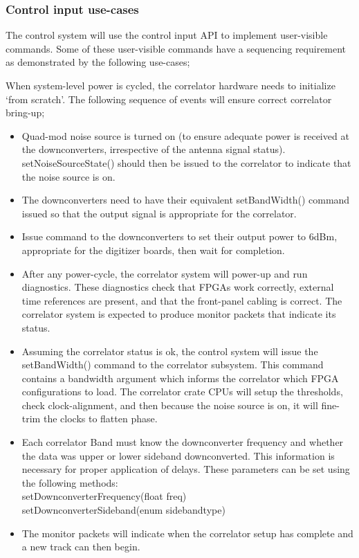 \documentclass[11pt]{article}
\begin{document}
\subsubsection{Control input use-cases}

The control system will use the control input API to implement user-visible
commands. Some of these user-visible commands have a sequencing requirement as
demonstrated by the following use-cases;

\vskip5mm

When system-level power is cycled, the correlator hardware needs to initialize
`from scratch'. The following sequence of events will ensure correct
correlator bring-up;
%
\begin{itemize}
\item Quad-mod noise source is turned on (to ensure adequate
power is received at the downconverters, irrespective of the
antenna signal status). setNoiseSourceState() should then be issued to the correlator to indicate that the noise source is on.

\item The downconverters need to have their equivalent setBandWidth() command
issued so that the output signal
is appropriate for the correlator.

\item Issue command to the downconverters to set their output power to 6dBm,
appropriate for the digitizer boards, then wait for completion.

\item After any power-cycle, the correlator system will
power-up and run diagnostics. These diagnostics check that
FPGAs work correctly, external time references are present,
and that the front-panel cabling is correct. The correlator
system is expected to produce monitor packets that indicate
its status.

\item Assuming the correlator status is ok, the control system will issue the
setBandWidth() command to the correlator subsystem. This command contains a
bandwidth argument which informs the correlator which FPGA configurations to
load. The correlator crate CPUs will
setup the thresholds, check clock-alignment, and 
then because the noise source is on, it will fine-trim
the clocks to flatten phase.

\item Each correlator Band must know the downconverter frequency and whether
the data was upper or lower sideband downconverted. This information is
necessary for proper application of delays. These parameters can be set
using the following methods: \\
setDownconverterFrequency(float freq) \\
setDownconverterSideband(enum sidebandtype)

\item The monitor packets will indicate when the
correlator setup has complete and a new track can then begin.
\end{itemize}
\end{document}
